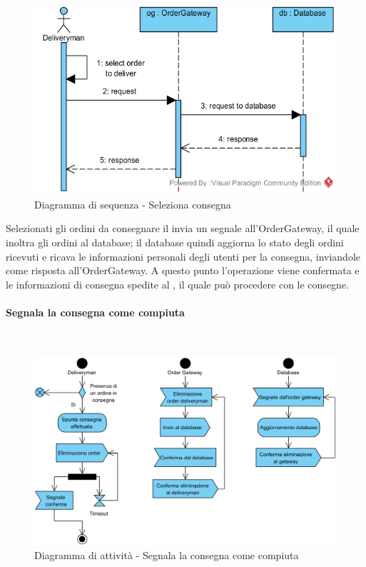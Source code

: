 \begin{figure}[H]
	\centering
	\includegraphics[width=14cm]{../../documenti/SpecificaTecnica/diagrammi_img/sequenza/fattorino_seleziona_consegna.png}
	\caption{Diagramma di sequenza - Seleziona consegna}
\end{figure}

Selezionati gli ordini da consegnare il \Deliveryman{} invia un segnale all'Order\-Gateway, il quale inoltra gli ordini al database; il database quindi aggiorna lo stato degli ordini ricevuti e ricava le informazioni personali degli utenti per la consegna, inviandole come risposta all'Order\-Gateway. A questo punto l'operazione viene confermata e le informazioni di consegna spedite al \Deliveryman{}, il quale può procedere con le consegne.


\paragraph{Segnala la consegna come compiuta}\mbox{}\\
\nopagebreak
\begin{figure}[H]
	\centering
	\includegraphics[width=14cm]{diagrammi_img/attivita/deliveryman_consegnato.png}
	\caption{Diagramma di attività - Segnala la consegna come compiuta}
\end{figure}

